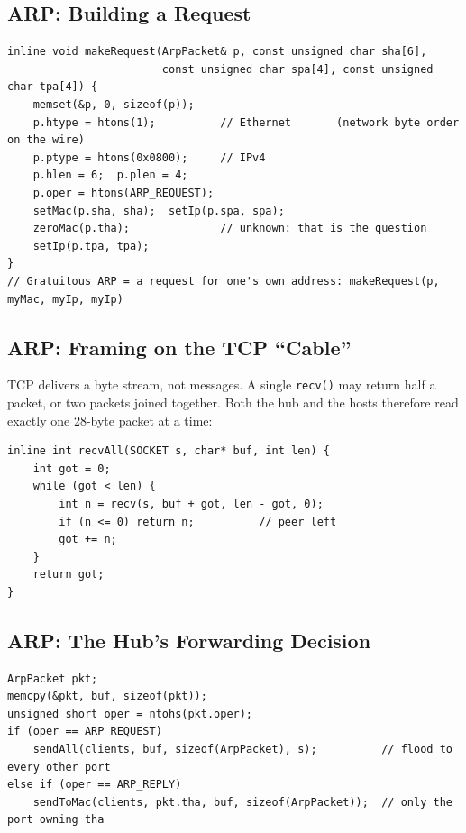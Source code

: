 \documentclass[11pt]{article}
\begin{document}
\subsection{ARP: Building a Request}
\begin{lstlisting}
inline void makeRequest(ArpPacket& p, const unsigned char sha[6],
                        const unsigned char spa[4], const unsigned char tpa[4]) {
    memset(&p, 0, sizeof(p));
    p.htype = htons(1);          // Ethernet       (network byte order on the wire)
    p.ptype = htons(0x0800);     // IPv4
    p.hlen = 6;  p.plen = 4;
    p.oper = htons(ARP_REQUEST);
    setMac(p.sha, sha);  setIp(p.spa, spa);
    zeroMac(p.tha);              // unknown: that is the question
    setIp(p.tpa, tpa);
}
// Gratuitous ARP = a request for one's own address: makeRequest(p, myMac, myIp, myIp)
\end{lstlisting}

\subsection{ARP: Framing on the TCP ``Cable''}
TCP delivers a byte stream, not messages. A single \texttt{recv()} may return half a
packet, or two packets joined together. Both the hub and the hosts therefore read exactly
one 28-byte packet at a time:
\begin{lstlisting}
inline int recvAll(SOCKET s, char* buf, int len) {
    int got = 0;
    while (got < len) {
        int n = recv(s, buf + got, len - got, 0);
        if (n <= 0) return n;          // peer left
        got += n;
    }
    return got;
}
\end{lstlisting}

\subsection{ARP: The Hub's Forwarding Decision}
\begin{lstlisting}
ArpPacket pkt;
memcpy(&pkt, buf, sizeof(pkt));
unsigned short oper = ntohs(pkt.oper);
if (oper == ARP_REQUEST)
    sendAll(clients, buf, sizeof(ArpPacket), s);          // flood to every other port
else if (oper == ARP_REPLY)
    sendToMac(clients, pkt.tha, buf, sizeof(ArpPacket));  // only the port owning tha
\end{lstlisting}
\end{document}
